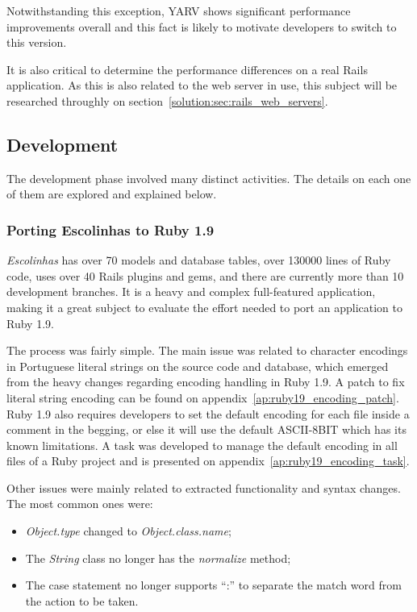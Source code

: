 Notwithstanding this exception, YARV shows significant performance improvements overall and this fact is likely to motivate developers to switch to this version.

It is also critical to determine the performance differences on a real Rails application. As this is also related to the web server in use, this subject will be researched throughly on section~\ref{solution:sec:rails_web_servers}.

\subsection{Development}
The development phase involved many distinct activities. The details on each one of them are explored and explained below.

\subsubsection{Porting Escolinhas to Ruby 1.9}
\textit{Escolinhas} has over 70 models and database tables, over 130000 lines of Ruby code, uses over 40 Rails plugins and gems, and there are currently more than 10 development branches. It is a heavy and complex full-featured application, making it a great subject to evaluate the effort needed to port an application to Ruby 1.9.

The process was fairly simple. The main issue was related to character encodings in Portuguese literal strings on the source code and database, which emerged from the heavy changes regarding encoding handling in Ruby 1.9. A patch to fix literal string encoding can be found on appendix~\ref{ap:ruby19_encoding_patch}. Ruby 1.9 also requires developers to set the default encoding for each file inside a comment in the begging, or else it will use the default ASCII-8BIT which has its known limitations. A task was developed to manage the default encoding in all files of a Ruby project and is presented on appendix~\ref{ap:ruby19_encoding_task}.

Other issues were mainly related to extracted functionality and syntax changes. The most common ones were:
\begin{itemize}
  \item \textit{Object.type} changed to \textit{Object.class.name};
  \item The \textit{String} class no longer has the \textit{normalize} method;
  \item The case statement no longer supports ``:'' to separate the match word from the action to be taken.
\end{itemize}

